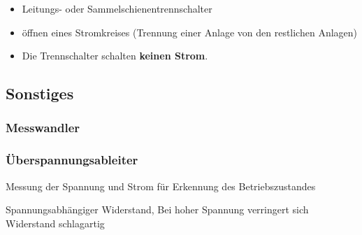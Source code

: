 \begin{itemize}
    \item Leitungs- oder Sammelschienentrennschalter
    \item öffnen eines Stromkreises (Trennung einer Anlage von den restlichen Anlagen)
    \item Die Trennschalter schalten \textbf{keinen Strom}.
\end{itemize}


\subsection{Sonstiges}

\begin{minipage}[c]{0.48\columnwidth}
    \subsubsection{Messwandler}
\end{minipage}
\hfill
\begin{minipage}[c]{0.48\columnwidth}
    \subsubsection{Überspannungsableiter}
\end{minipage}

\begin{minipage}[c]{0.48\columnwidth}
    Messung der Spannung und Strom für Erkennung des Betriebszustandes
\end{minipage}
\hfill
\begin{minipage}[c]{0.48\columnwidth}
    Spannungsabhängiger Widerstand, Bei hoher Spannung verringert sich Widerstand schlagartig
\end{minipage}

\vspace{0.15cm}

